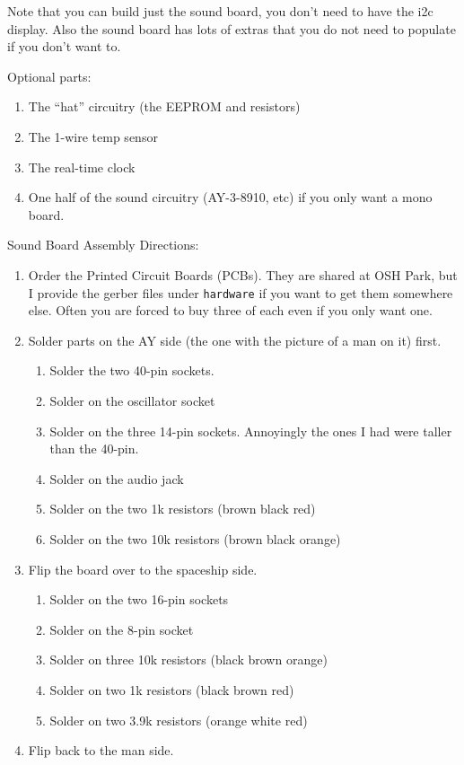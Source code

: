 \documentclass[11pt]{article}
\begin{document}
Note that you can build just the sound board, you don't need to have the i2c display.
Also the sound board has lots of extras that you do not need to populate if you don't want to.

Optional parts:
\begin{enumerate}
	\item The ``hat'' circuitry (the EEPROM and resistors)
	\item The 1-wire temp sensor
	\item The real-time clock
	\item One half of the sound circuitry (AY-3-8910, etc) if you only want
		a mono board.
\end{enumerate}


Sound Board Assembly Directions:
\begin{enumerate}
\item	Order the Printed Circuit Boards (PCBs).
	They are shared at OSH Park, but I provide the gerber files under
	{\tt hardware} if you want to get them somewhere else.
	Often you are forced to buy three of each even if you only want one.
\item	Solder parts on the AY side (the one with the picture of a man on it) first.
	\begin{enumerate}
		\item Solder the two 40-pin sockets.
		\item Solder on the oscillator socket
		\item Solder on the three 14-pin sockets.
			Annoyingly the ones I had were taller than the 40-pin.
		\item Solder on the audio jack
		\item Solder on the two 1k resistors (brown black red)
		\item Solder on the two 10k resistors (brown black orange)
	\end{enumerate}
\item	Flip the board over to the spaceship side.
	\begin{enumerate}
		\item Solder on the two 16-pin sockets
		\item Solder on the 8-pin socket
		\item Solder on three 10k resistors (black brown orange)
		\item Solder on two 1k resistors (black brown red)
		\item Solder on two 3.9k resistors (orange white red)
	\end{enumerate}
\item	Flip back to the man side.

\end{enumerate}
\end{document}
